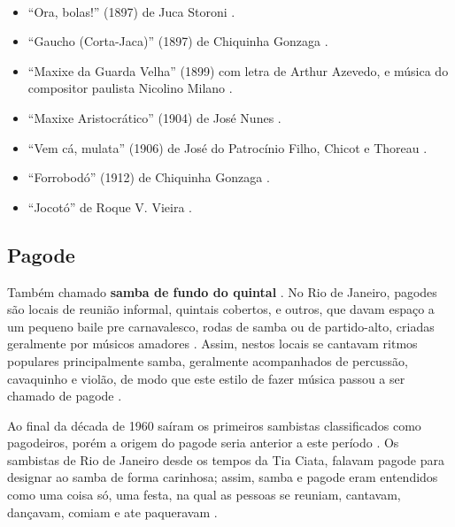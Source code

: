 \begin{example} ~

\begin{itemize}
\item ``Ora, bolas!'' (1897) de Juca Storoni \cite[pp. 108]{efege1974maxixe}.
\item ``Gaucho (Corta-Jaca)'' (1897) de Chiquinha Gonzaga \cite{reportagemtvmaxixe} \cite[pp. 30]{efege1974maxixe}.
\item ``Maxixe da Guarda Velha'' (1899) com letra de Arthur Azevedo, 
e música do compositor paulista Nicolino Milano  \cite{reportagemtvmaxixe}. 
\item ``Maxixe Aristocrático'' (1904) de José Nunes \cite{REIS2003}.
\item ``Vem cá, mulata'' (1906) de José do Patrocínio Filho, Chicot e Thoreau \cite{REIS2003}.
\item ``Forrobodó'' (1912) de Chiquinha Gonzaga \cite{REIS2003} \cite{reportagemtvmaxixe}.
\item ``Jocotó'' de Roque V. Vieira \cite{reportagemtvmaxixe}.
\end{itemize}
\end{example}

\subsection{Pagode}
Também chamado \textbf{samba de fundo do quintal}  \cite[pp. 130]{perna2002samba}.
No Rio de Janeiro, pagodes são locais de reunião informal, quintais cobertos, e outros,
que davam espaço a um pequeno baile pre carnavalesco, 
rodas de samba ou de partido-alto, criadas geralmente por músicos amadores \cite[pp. 130]{perna2002samba} \cite[pp. 241]{dourado2004dicionario} \cite[pp. 241]{dourado2004dicionario}.
Assim, nestos locais se cantavam ritmos populares principalmente samba,
geralmente acompanhados de percussão, cavaquinho e violão, 
de modo que este  estilo de fazer música passou a ser chamado de pagode \cite[pp. 63]{reinato2010musica}  \cite[pp. 130]{perna2002samba}.

Ao final da década de 1960 saíram os primeiros sambistas classificados como pagodeiros,
porém a origem do pagode seria anterior a este período \cite{sedano2018bezerra}.
Os sambistas de Rio de Janeiro desde os tempos da Tia Ciata, 
falavam pagode para designar ao samba de forma carinhosa; 
assim, samba e pagode eram entendidos como uma coisa só, uma festa, 
na qual as pessoas se reuniam, cantavam, dançavam, comiam e ate paqueravam \cite[pp. 209]{diniz2006almanaque}.

